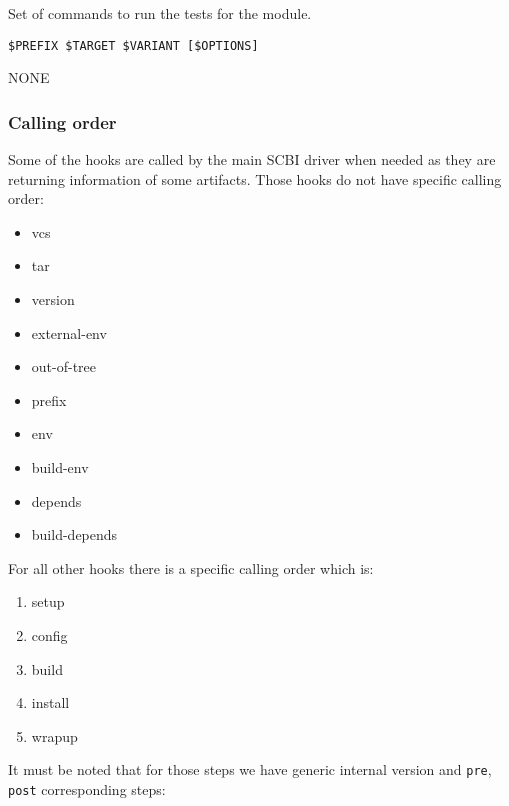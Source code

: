 \documentclass[a4paper,12pt,twoside]{article}
\newcommand{\code}[1]{\texttt{#1}}
\begin{document}
\begin{description}[font=\large\texttt]
	\item[<module>{[}-<variant>{]}-tests] Set of commands to run the tests for the module.
	\label{tests-hook}
	\begin{description}[font=\textit,style=standard]
		\item[parameter] \tabto{2cm} \code{\$PREFIX \$TARGET \$VARIANT [\$OPTIONS]}
		\item[return] \tabto{2cm} NONE
	\end{description}

\end{description}

\subsubsection{Calling order}

Some of the hooks are called by the main SCBI driver when needed as they are returning information of some artifacts. Those hooks do not have specific calling order:

\begin{itemize}
	\item vcs
	\item tar
	\item version
	\item external-env
	\item out-of-tree
	\item prefix
	\item env
	\item build-env
	\item depends
	\item build-depends
\end{itemize}

For all other hooks there is a specific calling order which is:

\begin{enumerate}
	\item setup
	\item config
	\item build
	\item install
	\item wrapup
\end{enumerate}

It must be noted that for those steps we have generic internal version and \code{pre}, \code{post} corresponding steps:
\end{document}
